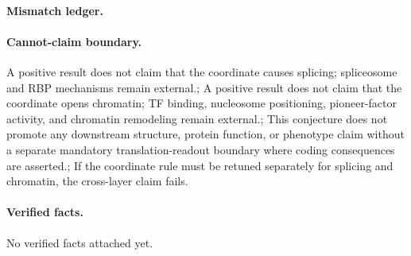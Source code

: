 \paragraph{Mismatch ledger.}
\paragraph{Cannot-claim boundary.} A positive result does not claim that the coordinate causes splicing; spliceosome and RBP mechanisms remain external.; A positive result does not claim that the coordinate opens chromatin; TF binding, nucleosome positioning, pioneer-factor activity, and chromatin remodeling remain external.; This conjecture does not promote any downstream structure, protein function, or phenotype claim without a separate mandatory translation-readout boundary where coding consequences are asserted.; If the coordinate rule must be retuned separately for splicing and chromatin, the cross-layer claim fails.

\paragraph{Verified facts.}
No verified facts attached yet.
